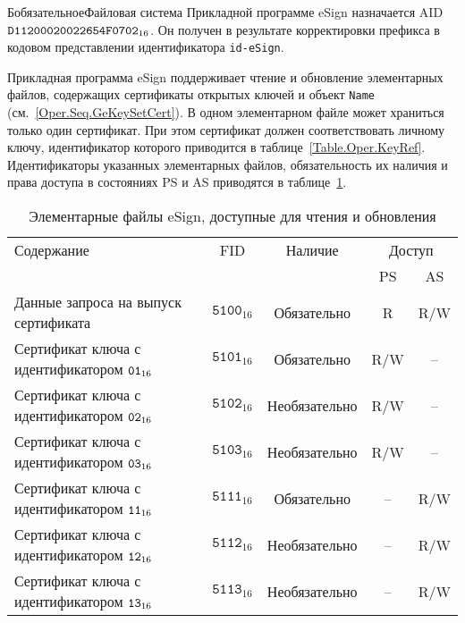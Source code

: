\begin{appendix}{Б}{обязательное}{Файловая система}
Прикладной программе eSign назначается AID~$\texttt{D11200020022654F0702}_{16}$. 
Он получен в результате корректировки префикса в кодовом представлении 
идентификатора \verb|id-eSign|.

Прикладная программа eSign поддерживает чтение и обновление 
элементарных файлов, содержащих сертификаты открытых ключей и 
объект \texttt{Name} (см.~\ref{Oper.Seq.GeKeySetCert}). 
В одном элементарном файле может храниться только один
сертификат. При этом сертификат должен
соответствовать личному ключу, идентификатор которого приводится
в таблице~\ref{Table.Oper.KeyRef}.
Идентификаторы указанных элементарных файлов,
обязательность их наличия и права доступа 
в состояниях PS и AS приводятся в 
таблице~\ref{Table.FILES.EFSIGN}.
 

\begin{table}[H]
\caption{Элементарные файлы eSign, доступные для чтения и обновления}
\label{Table.FILES.EFSIGN}
\begin{tabular}{|l|c|c|c|c|}
\hline
Содержание & FID & Наличие & \multicolumn{2}{|c|}{Доступ}\\
\cline{4-5}
& & & PS & AS \\
\hline
\hline
Данные запроса на выпуск сертификата & 
$\texttt{5100}_{16}$ & Обязательно &  R & R/W \\
Сертификат ключа с идентификатором $\texttt{01}_{16}$ & 
$\texttt{5101}_{16}$ & Обязательно & R/W & -- \\
Сертификат ключа с идентификатором $\texttt{02}_{16}$ & 
$\texttt{5102}_{16}$ & Необязательно & R/W & -- \\
Сертификат ключа с идентификатором $\texttt{03}_{16}$ & 
$\texttt{5103}_{16}$ & Необязательно & R/W & -- \\
Сертификат ключа с идентификатором $\texttt{11}_{16}$ & 
$\texttt{5111}_{16}$ & Обязательно & -- & R/W \\
Сертификат ключа с идентификатором $\texttt{12}_{16}$ & 
$\texttt{5112}_{16}$ & Необязательно &  -- & R/W \\
Сертификат ключа с идентификатором $\texttt{13}_{16}$ & 
$\texttt{5113}_{16}$ & Необязательно & -- & R/W \\
\hline
\end{tabular}
\end{table}






\end{appendix}